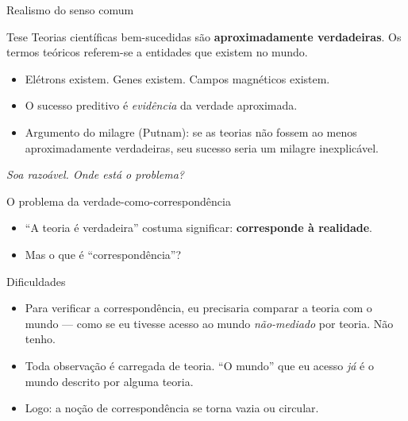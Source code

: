 \documentclass[aspectratio=169]{beamer}
\newcommand{\impt}[1]{\textcolor{maccent}{\textbf{#1}}}
\newcommand{\ntc}[1]{\textcolor{mprimary}{#1}}
\begin{document}
\begin{frame}{Realismo do senso comum}
\begin{block}{Tese}
Teorias cient\'ificas bem-sucedidas s\~ao \impt{aproximadamente verdadeiras}. Os termos te\'oricos referem-se a entidades que existem no mundo.
\end{block}
\vspace{0.3cm}
\begin{itemize}
    \item El\'etrons existem. Genes existem. Campos magn\'eticos existem.
    \item O sucesso preditivo \'e \emph{evid\^encia} da verdade aproximada.
    \item \ntc{Argumento do milagre} (Putnam): se as teorias n\~ao fossem ao menos aproximadamente verdadeiras, seu sucesso seria um milagre inexplic\'avel.
\end{itemize}
\vspace{0.3cm}
\begin{center}
\itshape Soa razo\'avel. Onde est\'a o problema?
\end{center}
\end{frame}

\begin{frame}{O problema da verdade-como-correspond\^encia}
\begin{itemize}
    \item ``A teoria \'e verdadeira'' costuma significar: \impt{corresponde \`a realidade}.
    \item Mas o que \'e ``correspond\^encia''?
\end{itemize}
\vspace{0.3cm}
\begin{alertblock}{Dificuldades}
\begin{itemize}
    \item Para verificar a correspond\^encia, eu precisaria \ntc{comparar} a teoria com o mundo --- como se eu tivesse acesso ao mundo \emph{n\~ao-mediado} por teoria. N\~ao tenho.
    \item Toda observa\c c\~ao \'e carregada de teoria. ``O mundo'' que eu acesso \emph{j\'a} \'e o mundo descrito por alguma teoria.
\end{itemize}
\end{alertblock}
\vspace{0.3cm}
\begin{itemize}
    \item Logo: a no\c c\~ao de correspond\^encia se torna \ntc{vazia} ou \ntc{circular}.
\end{itemize}
\end{frame}
\end{document}
